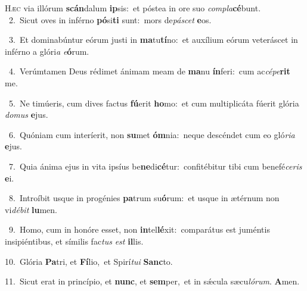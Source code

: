 \lettrine{\initial\textcolor{\initialcolor}{H}}{æc} via illórum \textbf{scán}\-dalum \textbf{ip}\-sis:~\star et póstea in ore suo \textit{com}\-\textit{pla}\textbf{cé}bunt.\\
{\numbfont\textcolor{\numbcolor}{~2.}}~Sicut oves in inférno \textbf{pó}\-si\textbf{ti} sunt:~\star mors de\-\textit{pá}\-\textit{scet} \textbf{e}\-os.\par
{\numbfont\textcolor{\numbcolor}{~3.}}~Et dominabúntur eórum justi in \textbf{ma}\-tu\-\textbf{tí}\-no:~\star et auxílium eórum veteráscet in inférno a glóri\textit{a} \textit{e}\-\textbf{ó}rum.\par
{\numbfont\textcolor{\numbcolor}{~4.}}~Verúmtamen Deus rédimet ánimam meam de \textbf{ma}\-nu \textbf{ín}\-feri:~\star cum ac\-\textit{cé}\-\textit{pe}\textbf{rit} me.\par
{\numbfont\textcolor{\numbcolor}{~5.}}~Ne timúeris, cum dives factus \textbf{fú}\-erit \textbf{ho}\-mo:~\star et cum multiplicáta fúerit glória \textit{do}\-\textit{mus} \textbf{e}\-jus.\par
{\numbfont\textcolor{\numbcolor}{~6.}}~Quóniam cum interíerit, non \textbf{su}\-met \textbf{óm}\-nia:~\star neque descéndet cum eo gló\-\textit{ri}\-\textit{a} \textbf{e}\-jus.\par
{\numbfont\textcolor{\numbcolor}{~7.}}~Quia ánima ejus in vita ipsíus be\-\textbf{ne}\-di\-\textbf{cé}\-tur:~\star confitébitur tibi cum benefé\-\textit{ce}\-\textit{ris} \textbf{e}\-i.\par
{\numbfont\textcolor{\numbcolor}{~8.}}~Introíbit usque in progénies \textbf{pa}\-trum su\-\textbf{ó}\-rum:~\star et usque in ætérnum non vi\-\textit{dé}\-\textit{bit} \textbf{lu}\-men.\par
{\numbfont\textcolor{\numbcolor}{~9.}}~Homo, cum in honóre esset, non \textbf{in}\-tel\-\textbf{lé}\-xit:~\star comparátus est juméntis insipiéntibus, et símilis fac\textit{tus} \textit{est} \textbf{il}\-lis.\par
{\numbfont\textcolor{\numbcolor}{10.}}~Glória \textbf{Pa}\-tri, et \textbf{Fí}\-lio,~\star et Spirí\-\textit{tu}\-\textit{i} \textbf{Sanc}\-to.\par
{\numbfont\textcolor{\numbcolor}{11.}}~Sicut erat in princípio, et \textbf{nunc}\-, et \textbf{sem}\-per,~\star et in sǽcula sæcu\-\textit{ló}\-\textit{rum}. \textbf{A}\-men.\par
